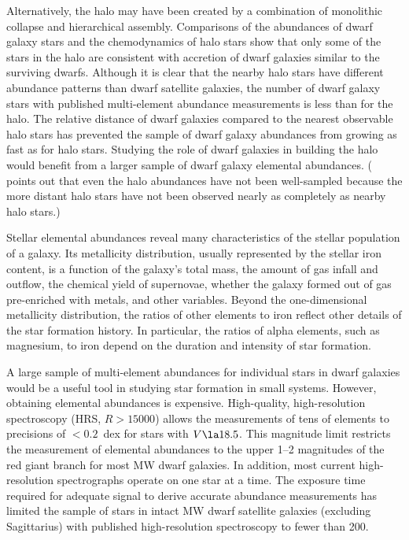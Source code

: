 \documentclass{emulateapj}
\begin{document}
Alternatively, the halo may have been created by a combination of
monolithic collapse \citep*{egg62} and hierarchical assembly.
Comparisons of the abundances of dwarf galaxy stars and the
chemodynamics of halo stars \citep[e.g.,][]{gra03,ven04} show that
only some of the stars in the halo are consistent with accretion of
dwarf galaxies similar to the surviving dwarfs.  Although it is clear
that the nearby halo stars have different abundance patterns than
dwarf satellite galaxies, the number of dwarf galaxy stars with
published multi-element abundance measurements is less than for the
halo.  The relative distance of dwarf galaxies compared to the nearest
observable halo stars has prevented the sample of dwarf galaxy
abundances from growing as fast as for halo stars.  Studying the role
of dwarf galaxies in building the halo would benefit from a larger
sample of dwarf galaxy elemental abundances.  (\citeauthor{roe09}
\citeyear{roe09} points out that even the halo abundances have not
been well-sampled because the more distant halo stars have not been
observed nearly as completely as nearby halo stars.)

Stellar elemental abundances reveal many characteristics of the
stellar population of a galaxy.  Its metallicity distribution, usually
represented by the stellar iron content, is a function of the galaxy's
total mass, the amount of gas infall and outflow, the chemical yield
of supernovae, whether the galaxy formed out of gas pre-enriched with
metals, and other variables.  Beyond the one-dimensional metallicity
distribution, the ratios of other elements to iron reflect other
details of the star formation history.  In particular, the ratios of
alpha elements, such as magnesium, to iron depend on the duration and
intensity of star formation.

A large sample of multi-element abundances for individual stars in
dwarf galaxies would be a useful tool in studying star formation in
small systems.  However, obtaining elemental abundances is expensive.
High-quality, high-resolution spectroscopy (HRS, $R > 15000$) allows
the measurements of tens of elements to precisions of $<0.2$~dex for
stars with $V \la 18.5$.  This magnitude limit restricts the
measurement of elemental abundances to the upper 1--2 magnitudes of
the red giant branch for most MW dwarf galaxies.  In addition, most
current high-resolution spectrographs operate on one star at a time.
The exposure time required for adequate signal to derive accurate
abundance measurements has limited the sample of stars in intact MW
dwarf satellite galaxies (excluding Sagittarius) with published
high-resolution spectroscopy to fewer than 200.
\end{document}
